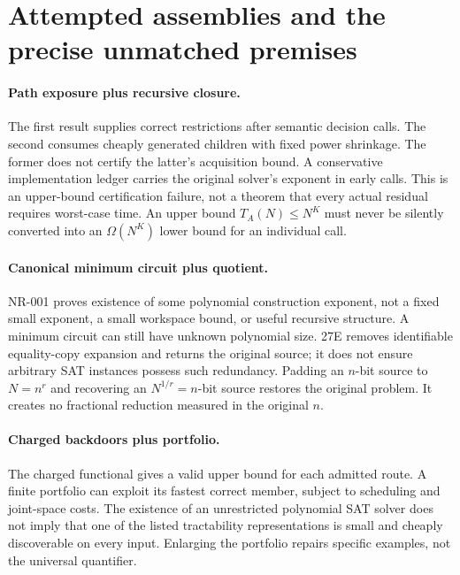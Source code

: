 \documentclass[11pt]{article}
\begin{document}
\section{Attempted assemblies and the precise unmatched premises}
\paragraph{Path exposure plus recursive closure.}
The first result supplies correct restrictions after semantic decision calls. The second consumes cheaply generated children with fixed power shrinkage. The former does not certify the latter's acquisition bound. A conservative implementation ledger carries the original solver's exponent in early calls. This is an upper-bound certification failure, not a theorem that every actual residual requires worst-case time. An upper bound $T_A(N)\le N^K$ must never be silently converted into an $\Omega(N^K)$ lower bound for an individual call.

\paragraph{Canonical minimum circuit plus quotient.}
NR-001 proves existence of some polynomial construction exponent, not a fixed small exponent, a small workspace bound, or useful recursive structure. A minimum circuit can still have unknown polynomial size. 27E removes identifiable equality-copy expansion and returns the original source; it does not ensure arbitrary SAT instances possess such redundancy. Padding an $n$-bit source to $N=n^r$ and recovering an $N^{1/r}=n$-bit source restores the original problem. It creates no fractional reduction measured in the original $n$.

\paragraph{Charged backdoors plus portfolio.}
The charged functional gives a valid upper bound for each admitted route. A finite portfolio can exploit its fastest correct member, subject to scheduling and joint-space costs. The existence of an unrestricted polynomial SAT solver does not imply that one of the listed tractability representations is small and cheaply discoverable on every input. Enlarging the portfolio repairs specific examples, not the universal quantifier.
\end{document}
